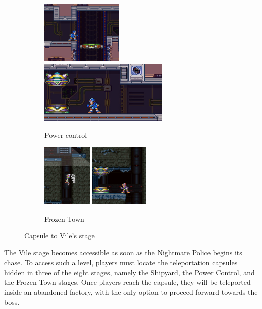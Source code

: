 \begin{figure}[htp]
	\begin{subfigure}{\linewidth}
		\centering
		\includegraphics[height=3cm]{figures/X3/Volt_catfish/vile_1.jpg}
		\includegraphics[height=3cm]{figures/X3/Volt_catfish/vile_2.jpg}
		\caption{Power control }
	\end{subfigure}
	\begin{subfigure}{\linewidth}
		\centering
		\includegraphics[height=3cm]{figures/X3/Blizzard_buffalo/Vile_1.jpg}
		\includegraphics[height=3cm]{figures/X3/Blizzard_buffalo/Vile_2.jpg}
		\caption{Frozen Town}
	\end{subfigure}
	\caption{Capsule to Vile's stage}
\end{figure}

The Vile stage becomes accessible as soon as the Nightmare Police begins its chase. To access such a level, players must locate the teleportation capsules hidden in three of the eight stages, namely the Shipyard, the Power Control, and the Frozen Town stages. Once players reach the capsule, they will be teleported inside an abandoned factory, with the only option to proceed forward towards the boss.

